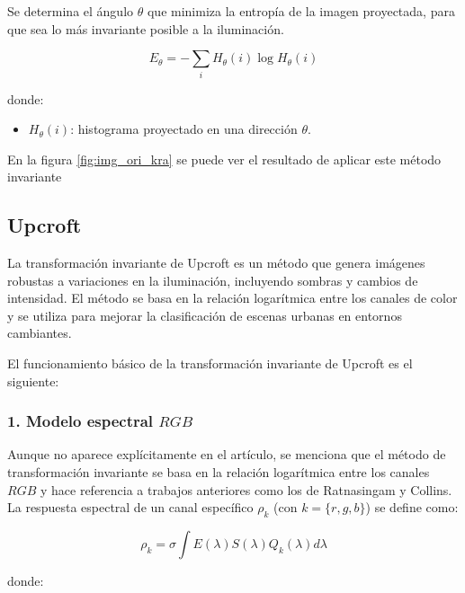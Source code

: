 Se determina el ángulo $\theta$ que minimiza la entropía de la imagen proyectada, para que sea lo más invariante posible a la iluminación.

$$E_{\theta } =-\sum_i H_{\theta } (i)\log H_{\theta } (i)$$

donde:

\begin{itemize}
\setlength{\itemsep}{-1ex}
   \item{\begin{flushleft} $H_{\theta } (i)$: histograma proyectado en una dirección $\theta$. \end{flushleft}}
\end{itemize}

En la figura \ref{fig:img_ori_kra} se puede ver el resultado de aplicar este método invariante

\subsection{Upcroft}\label{upcrof}

La transformación invariante de Upcroft \cite{upcroft2014} es un método que genera imágenes robustas a variaciones en la iluminación, incluyendo sombras y cambios de intensidad. El método se basa en la relación logarítmica entre los canales de color y se utiliza para mejorar la clasificación de escenas urbanas en entornos cambiantes.

El funcionamiento básico de la transformación invariante de Upcroft es el siguiente:

\subsubsection{1. Modelo espectral $RGB$}

Aunque no aparece explícitamente en el artículo, se menciona que el método de transformación invariante se basa en la relación logarítmica entre los canales $RGB$ y hace referencia a trabajos anteriores como los de Ratnasingam y Collins. La respuesta espectral de un canal específico $\rho_k$ (con $k=\{r,g,b\}$) se define como:

$$\rho_k =\sigma \int E(\lambda )S(\lambda )Q_k (\lambda )d\lambda$$

donde:

